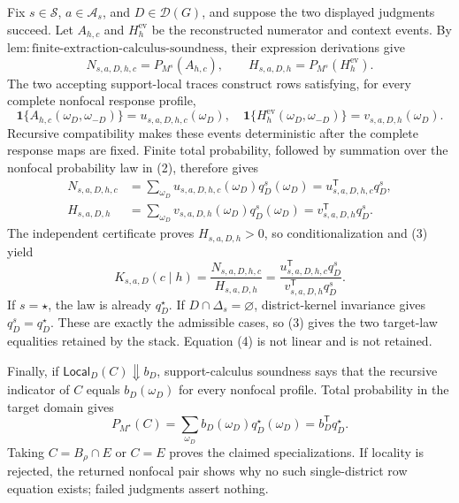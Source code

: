 Fix \(s\in\mathcal S\), \(a\in\mathcal A_s\), and \(D\in\mathcal D(G)\), and suppose the two displayed judgments succeed.  Let \(A_{h,c}\) and \(H_h^{\mathrm{ev}}\) be the reconstructed numerator and context events.  By \(\mathrm{lem:finite\text{-}extraction\text{-}calculus\text{-}soundness}\), their expression derivations give
\[
N_{s,a,D,h,c}=P_{M^s}(A_{h,c}),
\qquad H_{s,a,D,h}=P_{M^s}(H_h^{\mathrm{ev}}).
\tag{1}
\]
The two accepting support-local traces construct rows satisfying, for every complete nonfocal response profile,
\[
\mathbf 1\{A_{h,c}(\omega_D,\omega_{-D})\}
=u_{s,a,D,h,c}(\omega_D),
\quad
\mathbf 1\{H_h^{\mathrm{ev}}(\omega_D,\omega_{-D})\}
=v_{s,a,D,h}(\omega_D).
\tag{2}
\]
Recursive compatibility makes these events deterministic after the complete response maps are fixed.  Finite total probability, followed by summation over the nonfocal probability law in (2), therefore gives
\[
\begin{aligned}
N_{s,a,D,h,c}
&=\sum_{\omega_D}u_{s,a,D,h,c}(\omega_D)q_D^s(\omega_D)
=u_{s,a,D,h,c}^{\mathsf T}q_D^s,\\
H_{s,a,D,h}
&=\sum_{\omega_D}v_{s,a,D,h}(\omega_D)q_D^s(\omega_D)
=v_{s,a,D,h}^{\mathsf T}q_D^s.
\end{aligned}
\tag{3}
\]
The independent certificate proves \(H_{s,a,D,h}>0\), so conditionalization and (3) yield
\[
K_{s,a,D}(c\mid h)=\frac{N_{s,a,D,h,c}}{H_{s,a,D,h}}
=\frac{u_{s,a,D,h,c}^{\mathsf T}q_D^s}
{v_{s,a,D,h}^{\mathsf T}q_D^s}.
\tag{4}
\]
If \(s=\star\), the law is already \(q_D^\star\).  If \(D\cap\Delta_s=\varnothing\), district-kernel invariance gives \(q_D^s=q_D^\star\).  These are exactly the admissible cases, so (3) gives the two target-law equalities retained by the stack.  Equation (4) is not linear and is not retained.

Finally, if \(\mathsf{Local}_D(C)\Downarrow b_D\), support-calculus soundness says that the recursive indicator of \(C\) equals \(b_D(\omega_D)\) for every nonfocal profile.  Total probability in the target domain gives
\[
P_{M^\star}(C)=\sum_{\omega_D}b_D(\omega_D)q_D^\star(\omega_D)
=b_D^{\mathsf T}q_D^\star.
\]
Taking \(C=B_\rho\cap E\) or \(C=E\) proves the claimed specializations.  If locality is rejected, the returned nonfocal pair shows why no such single-district row equation exists; failed judgments assert nothing.